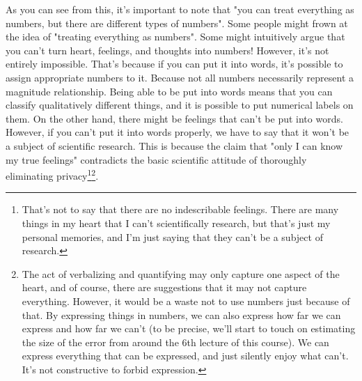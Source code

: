 \documentclass{ltjsbook}
\begin{document}
As you can see from this, it's important to note that "you can treat everything as numbers, but there are different types of numbers". Some people might frown at the idea of "treating everything as numbers". Some might intuitively argue that you can't turn heart, feelings, and thoughts into numbers! However, it's not entirely impossible. That's because if you can put it into words, it's possible to assign appropriate numbers to it. Because not all numbers necessarily represent a magnitude relationship. Being able to be put into words means that you can classify qualitatively different things, and it is possible to put numerical labels on them. On the other hand, there might be feelings that can't be put into words. However, if you can't put it into words properly, we have to say that it won't be a subject of scientific research. This is because the claim that "only I can know my true feelings" contradicts the basic scientific attitude of thoroughly eliminating privacy\footnote{That's not to say that there are no indescribable feelings. There are many things in my heart that I can't scientifically research, but that's just my personal memories, and I'm just saying that they can't be a subject of research.}\footnote{The act of verbalizing and quantifying may only capture one aspect of the heart, and of course, there are suggestions that it may not capture everything. However, it would be a waste not to use numbers just because of that. By expressing things in numbers, we can also express how far we can express and how far we can't (to be precise, we'll start to touch on estimating the size of the error from around the 6th lecture of this course). We can express everything that can be expressed, and just silently enjoy what can't. It's not constructive to forbid expression.}.
\end{document}
